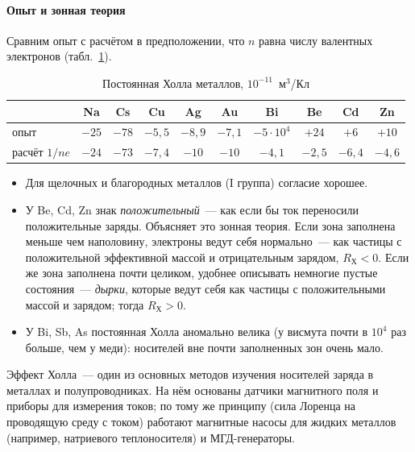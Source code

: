 \paragraph{Опыт и зонная теория}
Сравним опыт с расчётом в предположении, что $n$ равна числу валентных
электронов (табл.~\ref{tab:hall}).

\begin{table}[ht]
\centering
\caption{Постоянная Холла металлов, $10^{-11}$~м$^3$/Кл}
\label{tab:hall}
\small
\begin{tabular}{@{}lccccccccc@{}}
\toprule
 & Na & Cs & Cu & Ag & Au & Bi & Be & Cd & Zn \\
\midrule
опыт & $-25$ & $-78$ & $-5{,}5$ & $-8{,}9$ & $-7{,}1$ & $-5\cdot10^4$ & $+24$ & $+6$ & $+10$ \\
расчёт $1/ne$ & $-24$ & $-73$ & $-7{,}4$ & $-10$ & $-10$ & $-4{,}1$ & $-2{,}5$ & $-6{,}4$ & $-4{,}6$ \\
\bottomrule
\end{tabular}
\end{table}

\begin{itemize}
\item Для щелочных и благородных металлов (I группа) согласие хорошее.
\item У Be, Cd, Zn знак \emph{положительный}~— как если бы ток переносили
положительные заряды. Объясняет это зонная теория. Если зона заполнена
меньше чем наполовину, электроны ведут себя нормально~— как частицы с
положительной эффективной массой и отрицательным зарядом, $R_\text{Х}<0$.
Если же зона заполнена почти целиком, удобнее описывать немногие
пустые состояния~— \emph{дырки}, которые ведут себя как частицы с
положительными массой и зарядом; тогда $R_\text{Х}>0$.
\item У Bi, Sb, As постоянная Холла аномально велика (у висмута почти в
$10^4$ раз больше, чем у меди): носителей вне почти заполненных зон
очень мало.
\end{itemize}

Эффект Холла~— один из основных методов изучения носителей заряда в
металлах и полупроводниках. На нём основаны датчики магнитного поля и
приборы для измерения токов; по тому же принципу (сила Лоренца на
проводящую среду с током) работают магнитные насосы для жидких металлов
(например, натриевого теплоносителя) и МГД-генераторы.
